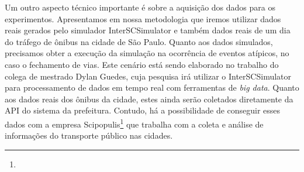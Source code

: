   Um outro aspecto técnico importante é sobre a aquisição dos dados para os
experimentos. Apresentamos em nossa metodologia que iremos utilizar dados reais
gerados pelo simulador InterSCSimulator e também dados reais de um dia do
tráfego de ônibus na cidade de São Paulo. Quanto aos dados simulados,
precisamos obter a execução da simulação na ocorrência de eventos atípicos, no
caso o fechamento de vias.  Este cenário está sendo elaborado no trabalho do
colega de mestrado Dylan Guedes, cuja pesquisa irá utilizar o InterSCSimulator
para processamento de dados em tempo real com ferramentas de \emph{big data}.
Quanto aos dados reais dos ônibus da cidade, estes ainda serão coletados
diretamente da API do sistema da prefeitura. Contudo, há a possibilidade de
conseguir esses dados com a empresa
Scipopulis\footnote{} que trabalha com a coleta e
análise de informações do transporte público nas cidades.


